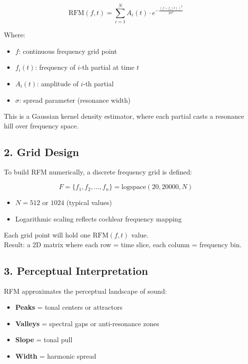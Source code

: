 \[
\text{RFM}(f, t) = \sum_{i=1}^N A_i(t) \cdot e^{-\frac{(f - f_i(t))^2}{2\sigma^2}}
\]

Where:

\begin{itemize}
    \item $f$: continuous frequency grid point
    \item $f_i(t)$: frequency of $i$-th partial at time $t$
    \item $A_i(t)$: amplitude of $i$-th partial
    \item $\sigma$: spread parameter (resonance width)
\end{itemize}

This is a Gaussian kernel density estimator, where each partial casts a resonance hill over frequency space.

\subsection*{2. Grid Design}

To build RFM numerically, a discrete frequency grid is defined:

\[
F = \{ f_1, f_2, ..., f_n \} = \text{logspace}(20, 20000, N)
\]

\begin{itemize}
    \item $N = 512$ or $1024$ (typical values)
    \item Logarithmic scaling reflects cochlear frequency mapping
\end{itemize}

Each grid point will hold one $\text{RFM}(f, t)$ value.\\
Result: a 2D matrix where each row = time slice, each column = frequency bin.

\subsection*{3. Perceptual Interpretation}

RFM approximates the perceptual landscape of sound:

\begin{itemize}
    \item \textbf{Peaks} = tonal centers or attractors
    \item \textbf{Valleys} = spectral gaps or anti-resonance zones
    \item \textbf{Slope} = tonal pull
    \item \textbf{Width} = harmonic spread
\end{itemize}

